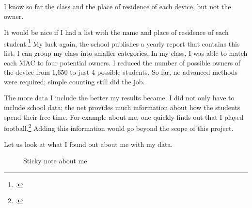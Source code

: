 \documentclass[paper=a4, fontsize=11pt]{article}
\begin{document}
I know so far the class and the place of residence of each device, but not the owner.

It would be nice if I had a list with the name and place of residence of each student.\footcite{jahresbericht2019} My luck again, the school publishes a yearly report that contains this list. I can group my class into smaller categories. In my class, I was able to match each MAC to four potential owners. I reduced the number of possible owners of the device from 1,650 to just 4 possible students. So far, no advanced methods were required; simple counting still did the job.

The more data I include the better my results became. I did not only have to include school data; the net provides much information about how the students spend their free time. For example about me, one quickly finds out that I played football.\footcite{midlandbouncers} Adding this information would go beyond the scope of this project.

Let us look at what I found out about me with my data.
\begin{figure}
\begin{center}
\end{center}
\caption{Sticky note about me \label{fig:facts}}
\end{figure}
\end{document}
